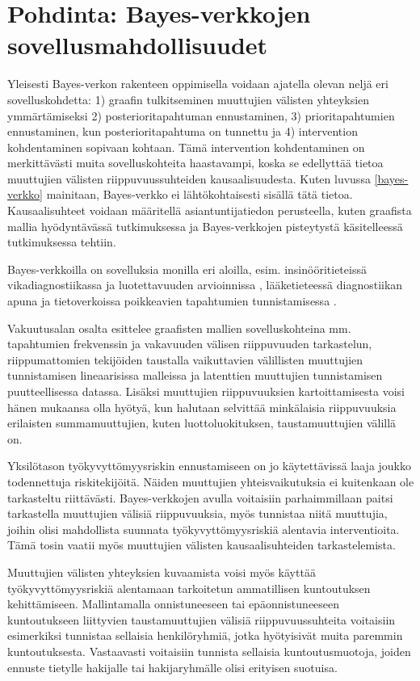 \chapter{Pohdinta: Bayes-verkkojen sovellusmahdollisuudet \label{conclusions}}
Yleisesti Bayes-verkon rakenteen oppimisella voidaan ajatella olevan neljä eri sovelluskohdetta: 1) graafin tulkitseminen muuttujien välisten yhteyksien ymmärtämiseksi 2) posterioritapahtuman ennustaminen, 3) prioritapahtumien ennustaminen, kun posterioritapahtuma on tunnettu ja 4) intervention kohdentaminen sopivaan kohtaan. Tämä intervention kohdentaminen on merkittävästi muita sovelluskohteita haastavampi, koska se edellyttää tietoa muuttujien välisten riippuvuussuhteiden kausaalisuudesta. Kuten luvussa \ref{bayes-verkko} mainitaan, Bayes-verkko ei lähtökohtaisesti sisällä tätä tietoa. Kausaalisuhteet voidaan määritellä asiantuntijatiedon perusteella, kuten \citet{xu_workplace_2022} graafista mallia hyödyntävässä tutkimuksessa ja \citet{liu_empirical_2012} Bayes-verkkojen pisteytystä käsitelleessä tutkimuksessa tehtiin.

Bayes-verkkoilla on sovelluksia monilla eri aloilla, esim. insinööritieteissä vikadiagnostiikassa ja luotettavuuden arvioinnissa \citep{zhang_brief_2019}, lääketieteessä diagnostiikan apuna \citep{mittal_review_2011} ja tietoverkoissa poikkeavien tapahtumien tunnistamisessa \citep{kaur_review_2013}.

Vakuutusalan osalta \citet{ramsahai_connecting_2020} esittelee graafisten mallien sovelluskohteina mm. tapahtumien frekvenssin ja vakavuuden välisen riippuvuuden tarkastelun, riippumattomien tekijöiden taustalla vaikuttavien välillisten muuttujien tunnistamisen lineaarisissa malleissa ja latenttien muuttujien tunnistamisen puutteellisessa datassa. Lisäksi muuttujien riippuvuuksien kartoittamisesta voisi hänen mukaansa olla hyötyä, kun halutaan selvittää minkälaisia riippuvuuksia erilaisten summamuuttujien, kuten luottoluokituksen, taustamuuttujien välillä on. 

Yksilötason työkyvyttömyysriskin ennustamiseen on jo käytettävissä laaja joukko todennettuja riskitekijöitä.  Näiden muuttujien yhteisvaikutuksia ei kuitenkaan ole tarkasteltu riittävästi. Bayes-verkkojen avulla voitaisiin parhaimmillaan paitsi tarkastella muuttujien välisiä riippuvuuksia, myös tunnistaa niitä muuttujia, joihin olisi mahdollista suunnata työkyvyttömyysriskiä alentavia interventioita. Tämä tosin vaatii myös muuttujien välisten kausaalisuhteiden tarkastelemista. 

Muuttujien välisten yhteyksien kuvaamista voisi myös käyttää työkyvyttömyysriskiä alentamaan tarkoitetun ammatillisen kuntoutuksen kehittämiseen. Mallintamalla onnistuneeseen tai epäonnistuneeseen kuntoutukseen liittyvien taustamuuttujien välisiä riippuvuussuhteita voitaisiin esimerkiksi tunnistaa sellaisia henkilöryhmiä, jotka hyötyisivät muita paremmin kuntoutuksesta. Vastaavasti voitaisiin tunnista sellaisia kuntoutusmuotoja, joiden ennuste tietylle hakijalle tai hakijaryhmälle olisi erityisen suotuisa. 

